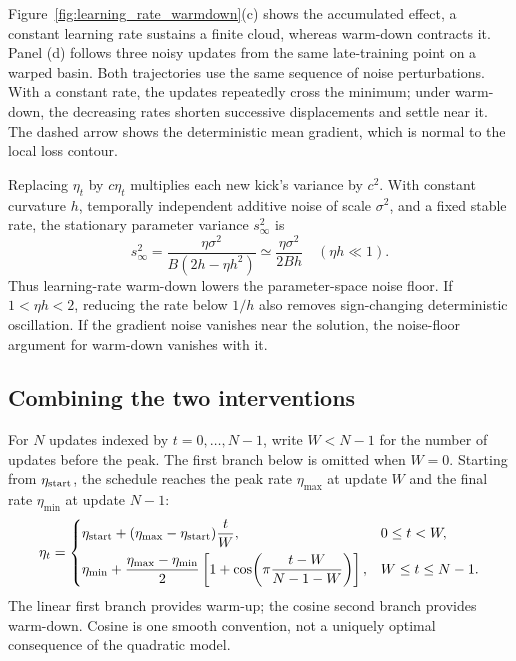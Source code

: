 \documentclass[11pt,letterpaper]{article}
\begin{document}
Figure~\ref{fig:learning_rate_warmdown}(c) shows the accumulated effect, a
constant learning rate sustains a finite cloud, whereas warm-down contracts
it. Panel (d) follows three noisy updates from the same late-training point on
a warped basin. Both trajectories use the same sequence of noise perturbations.
With a constant rate, the updates repeatedly cross the minimum; under warm-down,
the decreasing rates shorten successive displacements and settle near it. The
dashed arrow shows the deterministic mean gradient, which is normal to the
local loss contour.


Replacing \(\eta_t\) by \(c\eta_t\) multiplies each new kick's variance by
\(c^2\). With constant curvature \(h\), temporally independent additive noise
of scale \(\sigma^2\), and a fixed stable rate, the stationary parameter
variance \(s_\infty^2\) is
\begin{equation}\label{eq:stationary_variance}
  s_\infty^2
  =\frac{\eta\sigma^2}{B(2h-\eta h^2)}
  \simeq \frac{\eta\sigma^2}{2Bh}
  \quad (\eta h\ll1).
\end{equation}
Thus learning-rate warm-down lowers the parameter-space noise floor. If
\(1<\eta h<2\), reducing the rate below \(1/h\) also removes sign-changing
deterministic oscillation. If the gradient noise vanishes near the solution,
the noise-floor argument for warm-down vanishes with it.

\subsection{Combining the two interventions}

For \(N\) updates indexed by \(t=0,\ldots,N-1\), write \(W<N-1\) for the
number of updates before the peak. The first branch below is omitted when
\(W=0\). Starting from \(\eta_{\rm start}\), the schedule reaches the peak
rate \(\eta_{\max}\) at update \(W\) and the final rate \(\eta_{\min}\) at
update \(N-1\):
\begin{equation}\label{eq:warmup_cosine_schedule}
  \eta_t=
  \begin{cases}
    \eta_{\rm start}
    +(\eta_{\max}-\eta_{\rm start})\dfrac{t}{W},
      &0\leq t<W,\\[7pt]
    \eta_{\min}
    +\dfrac{\eta_{\max}-\eta_{\min}}{2}
      \left[1+\cos\!\left(\pi\dfrac{t-W}{N-1-W}\right)\right],
      &W\leq t\leq N-1.
  \end{cases}
\end{equation}
The linear first branch provides warm-up; the cosine second branch provides
warm-down. Cosine is one smooth convention, not a uniquely optimal
consequence of the quadratic model.
\end{document}
